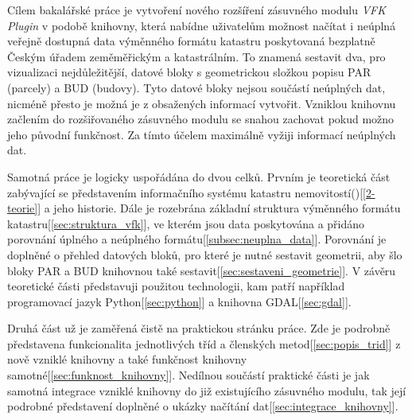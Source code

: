 Cílem bakalářské práce je vytvoření nového rozšíření zásuvného modulu \textit{VFK Plugin} v podobě knihovny, která nabídne uživatelům možnost načítat i neúplná veřejně dostupná data výměnného formátu katastru poskytovaná bezplatně Českým úřadem zeměměřickým a katastrálním.  To znamená sestavit dva, pro vizualizaci nejdůležitější, datové bloky s geometrickou složkou popisu PAR (parcely) a BUD (budovy). Tyto datové bloky nejsou součástí neúplných dat, nicméně přesto je možná je z obsažených informací vytvořit. Vzniklou knihovnu začlením do rozšiřovaného zásuvného modulu se snahou zachovat pokud možno jeho původní funkčnost. Za tímto účelem maximálně vyžiji informací neúplných dat.

Samotná práce je logicky uspořádána do dvou celků. Prvním je
teoretická část zabývající se představením informačního systému
katastru nemovitostí()[\ref{2-teorie}] a jeho historie. Dále je rozebrána
základní struktura výměnného formátu katastru[\ref{sec:struktura_vfk}], ve kterém
jsou data poskytována a přidáno porovnání úplného a neúplného formátu[\ref{subsec:neuplna_data}].
Porovnání je doplněné o přehled datových bloků, pro které je nutné sestavit
geometrii, aby šlo bloky PAR a BUD knihovnou také sestavit[\ref{sec:sestaveni_geometrie}]. V závěru teoretické části představuji
použitou technologii, kam patří například programovací jazyk Python[\ref{sec:python}] a
knihovna GDAL[\ref{sec:gdal}].

Druhá část už je zaměřená čistě na praktickou stránku
práce. Zde je podrobně představena funkcionalita jednotlivých tříd a členských
metod[\ref{sec:popis_trid}] z nově vzniklé knihovny a také funkčnost knihovny
samotné[\ref{sec:funknost_knihovny}]. Nedílnou součástí praktické části je jak samotná integrace vzniklé knihovny do
již existujícího zásuvného modulu, tak její podrobné představení
doplněné o ukázky načítání dat[\ref{sec:integrace_knihovny}].
